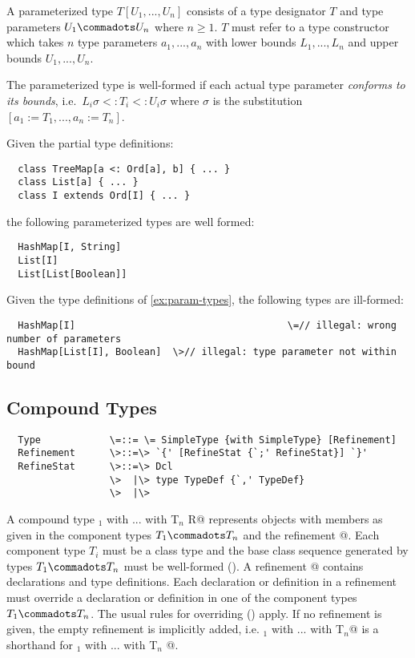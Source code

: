 \documentclass[11pt]{report}
\begin{document}
A parameterized type $T[U_1, ..., U_n]$ consists of a type designator
$T$ and type parameters $U_1 \commadots U_n$ where $n \geq 1$.  $T$
must refer to a type constructor which takes $n$ type parameters $a_1,
..., a_n$ with lower bounds $L_1, ..., L_n$ and upper bounds $U_1,
..., U_n$.

The parameterized type is well-formed if each actual type parameter
{\em conforms to its bounds}, i.e.\ $L_i\sigma <: T_i <: U_i\sigma$ where $\sigma$
is the substitution $[a_1 := T_1, ..., a_n := T_n]$.

\example\label{ex:param-types}
Given the partial type definitions:

\begin{verbatim}
  class TreeMap[a <: Ord[a], b] { ... }
  class List[a] { ... }
  class I extends Ord[I] { ... }
\end{verbatim}

the following parameterized types are well formed:

\begin{verbatim}
  HashMap[I, String]
  List[I]
  List[List[Boolean]]
\end{verbatim}

\example Given the type definitions of \ref{ex:param-types},
the following types are ill-formed:

\begin{verbatim}
  HashMap[I]			                         \=// illegal: wrong number of parameters
  HashMap[List[I], Boolean]  \>// illegal: type parameter not within bound
\end{verbatim}

\subsection{Compound Types}
\label{sec:compound-types}

\syntax\begin{verbatim} 
  Type            \=::= \= SimpleType {with SimpleType} [Refinement]
  Refinement      \>::=\> `{' [RefineStat {`;' RefineStat}] `}'
  RefineStat      \>::=\> Dcl
                  \>  |\> type TypeDef {`,' TypeDef}
                  \>  |\>
\end{verbatim}

A compound type \verb@T$_1$ with ... with T$_n$ {R}@ represents
objects with members as given in the component types $T_1 \commadots
T_n$ and the refinement @. Each component type $T_i$ must be a
class type and the base class sequence generated by types $T_1
\commadots T_n$ must be well-formed (). A
refinement @ contains declarations and type
definitions. Each declaration or definition in a refinement must
override a declaration or definition in one of the component types
$T_1 \commadots T_n$. The usual rules for overriding (\sref{})
apply. If no refinement is given, the empty refinement is implicitly
added, i.e. \verb@T$_1$ with ... with T$_n$@ is a shorthand for
\verb@T$_1$ with ... with T$_n$ {}@.
 
\end{document}
